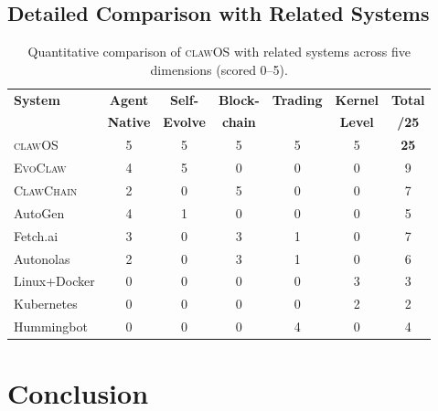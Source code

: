 \documentclass{article}
\newcommand{\clawos}{\textsc{clawOS}}
\newcommand{\evoclaw}{\textsc{EvoClaw}}
\newcommand{\clawchain}{\textsc{ClawChain}}
\begin{document}
%
%

\subsection{Detailed Comparison with Related Systems}

\begin{table}[t]
\caption{Quantitative comparison of \clawos{} with related systems across five dimensions (scored 0--5).}
\label{tab:radar}
\centering
\small
\begin{tabular}{lccccc|c}
\toprule
\textbf{System} & \textbf{Agent} & \textbf{Self-} & \textbf{Block-} & \textbf{Trading} & \textbf{Kernel} & \textbf{Total} \\
 & \textbf{Native} & \textbf{Evolve} & \textbf{chain} &  & \textbf{Level} & \textbf{/25} \\
\midrule
\clawos{} & 5 & 5 & 5 & 5 & 5 & \textbf{25} \\
\evoclaw{} & 4 & 5 & 0 & 0 & 0 & 9 \\
\clawchain{} & 2 & 0 & 5 & 0 & 0 & 7 \\
AutoGen & 4 & 1 & 0 & 0 & 0 & 5 \\
Fetch.ai & 3 & 0 & 3 & 1 & 0 & 7 \\
Autonolas & 2 & 0 & 3 & 1 & 0 & 6 \\
Linux+Docker & 0 & 0 & 0 & 0 & 3 & 3 \\
Kubernetes & 0 & 0 & 0 & 0 & 2 & 2 \\
Hummingbot & 0 & 0 & 0 & 4 & 0 & 4 \\
\bottomrule
\end{tabular}
\end{table}

%
%

\section{Conclusion}
\label{sec:conclusion}
\end{document}
